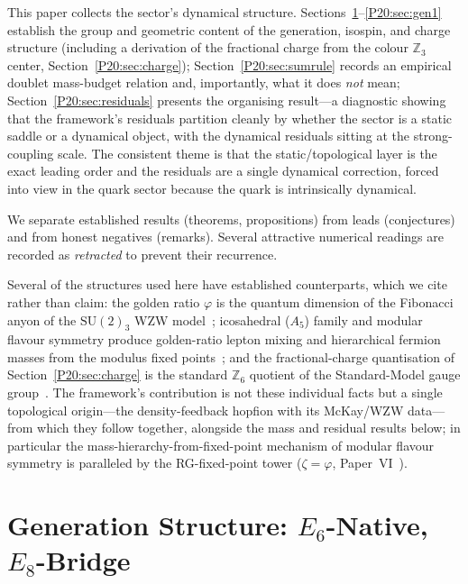 \documentclass[11pt,a4paper]{article}
\theoremstyle{definition}\newtheorem{definition}[theorem]{Definition}
\theoremstyle{remark}
\newcommand{\vp}{\varphi}
\newcommand{\SU}{\mathrm{SU}}
\newcommand{\Zthree}{\mathbb{Z}_3}
\begin{document}
This paper collects the sector's dynamical structure. Sections~\ref{P20:sec:groups}--\ref{P20:sec:gen1}
establish the group and geometric content of the generation, isospin,
and charge structure (including a derivation of the fractional charge
from the colour $\Zthree$ center, Section~\ref{P20:sec:charge});
Section~\ref{P20:sec:sumrule} records an empirical doublet
mass-budget relation and, importantly, what it does \emph{not} mean;
Section~\ref{P20:sec:residuals} presents the organising result---a
diagnostic showing that the framework's residuals partition cleanly by
whether the sector is a static saddle or a dynamical object, with the
dynamical residuals sitting at the strong-coupling scale. The
consistent theme is that the static/topological layer is the exact
leading order and the residuals are a single dynamical correction,
forced into view in the quark sector because the quark is intrinsically
dynamical.

We separate established results (theorems, propositions) from leads
(conjectures) and from honest negatives (remarks). Several attractive
numerical readings are recorded as \emph{retracted} to prevent their
recurrence.

Several of the structures used here have established counterparts, which
we cite rather than claim: the golden ratio $\vp$ is the quantum
dimension of the Fibonacci anyon of the $\SU(2)_3$ WZW
model~\cite{Nayak2008}; icosahedral ($A_5$) family and modular flavour
symmetry produce golden-ratio lepton mixing and hierarchical fermion
masses from the modulus fixed points~\cite{Everett2009,Feruglio2017,ModFlavHierarchy2025};
and the fractional-charge quantisation of Section~\ref{P20:sec:charge}
is the standard $\mathbb{Z}_6$ quotient of the Standard-Model gauge
group~\cite{FracCharge2024}. The framework's contribution is not these
individual facts but a single topological origin---the density-feedback
hopfion with its McKay/WZW data---from which they follow together,
alongside the mass and residual results below; in particular the
mass-hierarchy-from-fixed-point mechanism of modular flavour symmetry is
paralleled by the RG-fixed-point tower ($\zeta=\vp$, Paper~VI~\cite{Paper6}).

\section{Generation Structure: $E_6$-Native, $E_8$-Bridge}
\label{P20:sec:groups}
\end{document}
